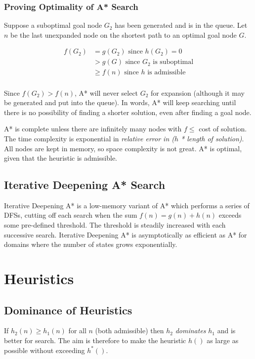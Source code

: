 \subsubsection{Proving Optimality of A* Search}
Suppose a suboptimal goal node $G_2$ has been generated and is in the queue.
Let $n$ be the last unexpanded node on the shortest path to an optimal goal
node $G$.

\begin{align*}
f(G_2) &= g(G_2) \text{  since $h(G_2) = 0$}\\
&> g(G) \text{  since $G_2$ is suboptimal}\\
&\geq f(n) \text{  since $h$ is admissible}\\
\end{align*}

Since $f(G_2) > f(n)$, A* will never select $G_2$ for expansion (although it
may be generated and put into the queue). In words, A* will keep searching
until there is no possibility of finding a shorter solution, even after finding
a goal node.

A* is complete unless there are infinitely many nodes with $f \leq$ cost of
solution. The time complexity is exponential in \textit{relative error in ($h$ * length
of solution)}. All nodes are kept in memory, so space complexity is not great. A*
is optimal, given that the heuristic is admissible.

\subsection{Iterative Deepening A* Search}
Iterative Deepening A* is a low-memory variant of A* which performs a series of
DFSs, cutting off each search when the sum $f(n) = g(n) + h(n)$ exceeds some
pre-defined threshold. The threshold is steadily increased with each successive
search. Iterative Deepening A* is asymptotically as efficient as A* for domains
where the number of states grows exponentially.

\section{Heuristics}
\subsection{Dominance of Heuristics}
If $h_{2}(n) \geq h_{1}(n)$ for all $n$ (both admissible) then $h_2$
\textit{dominates} $h_{1}$ and is better for search. The aim is therefore to
make the heuristic $h()$ as large as possible without exceeding $h^{*}()$.

